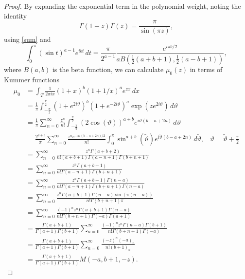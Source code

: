 \documentclass[12pt]{article}
\numberwithin{figure}{section}
\numberwithin{equation}{section}
\numberwithin{table}{section}
\begin{document}
\begin{proof}
By expanding the exponential term in the polynomial weight, noting the identity
\begin{equation}\nonumber
\Gamma(1-z)\Gamma(z)=\frac{\pi}{\sin(\pi z)},
\end{equation}
using \eqref{sum} and
\begin{equation}\nonumber
\int^{\pi}_0(\sin t)^{a-1}e^{ibt}\,dt=\frac{\pi}{2^{a-1}}\frac{e^{i\pi b/2}}{a{B}(\tfrac{1}{2}(a+b+1),\tfrac{1}{2}(a-b+1))},
\end{equation}
where $B(a,b)$  is the beta function, we can calculate $\mu_0(z)$ in terms of Kummer functions
\begin{align}\nonumber
\mu_{0}
&=\int_{T}\frac{1}{2\pi i x}(1+x)^ b(1+1/x)^ a e^{zx}\,dx\\\nonumber
&=\frac{1}{\pi}\int_{-\tfrac{\pi}{2}}^{\tfrac{\pi}{2}}(1+e^{2i\vartheta})^ b (1+e^{-2i\vartheta})^ a \exp(ze^{2i\vartheta})\,d\vartheta\\\nonumber
&=\frac{1}{\pi}\sum^\infty_{n=0}\frac{z^n}{n!}\int_{-\tfrac{\pi}{2}}^{\tfrac{\pi}{2}}(2\cos(\vartheta))^{ a+ b}e^{i\vartheta( b- a+2n)}\, d\vartheta\\\nonumber
&=\frac{2^{ a+ b}}{\pi}\sum^\infty_{n=0}\frac{z^ne^{-\pi i( b- a+2n)/2}}{n!}\int_{0}^{\pi}\sin^{ a+ b}(\widetilde\vartheta)e^{i\widetilde\vartheta( b- a+2n)}\,d\widetilde\vartheta,~~~~{\vartheta=\widetilde\vartheta+\tfrac{\pi}{2}}\\\nonumber
&=\sum^\infty_{n=0}\frac{z^n\Gamma( a+ b+2)}{n!( a+ b+1)\Gamma( a-n+1)\Gamma( b+n+1)}\\\nonumber
&=\sum^\infty_{n=0}\frac{z^n\Gamma( a+ b+1)}{n!\Gamma( a-n+1)\Gamma( b+n+1)}\\\nonumber
&=\sum^\infty_{n=0}\frac{z^n\Gamma( a+ b+1)\Gamma(n- a)}{n!\Gamma( a-n+1)\Gamma( b+n+1)\Gamma(n- a)}\\\nonumber
&=\sum^\infty_{n=0}\frac{z^n\Gamma( a+ b+1)\Gamma(n- a)\sin(\pi(n- a))}{n!\Gamma( b+n+1)\pi}\\\nonumber
&=\sum^\infty_{n=0}\frac{(-1)^nz^n\Gamma( a+ b+1)\Gamma(n- a)}{n!\Gamma( b+n+1)\Gamma(- a)\Gamma( a+1)}\\\nonumber
&=\frac{\Gamma( a+ b+1)}{\Gamma( a+1)\Gamma( b+1)}\sum^\infty_{n=0}\frac{(-1)^nz^n\Gamma(n- a)\Gamma( b+1)}{n!\Gamma( b+n+1)
\Gamma(- a)}\\\nonumber
&=\frac{\Gamma( a+ b+1)}{\Gamma( a+1)\Gamma( b+1)}\sum^\infty_{n=0}\frac{(-z)^n(- a)_n}{n!( b+1)_n}\\\nonumber
&=\frac{\Gamma( a+ b+1)}{\Gamma( a+1)\Gamma( b+1)} M(- a, b+1,-z).
\end{align}
\end{proof}
\end{document}

